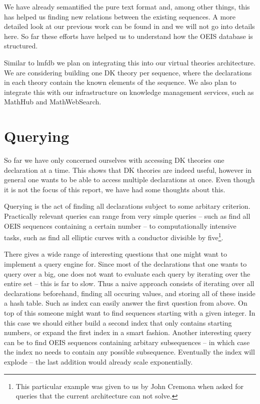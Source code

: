 We have already semantified the pure text format and, among other things, this has helped
us finding new relations between the existing sequences. A more detailed look at our
previous work can be found in \cite{LuzKoh:fsarfo16} and we will not go into details
here. So far these efforts have helped us to understand how the OEIS database is
structured.

Similar to lmfdb we plan on integrating this into our virtual theories architecture. We
are considering building one DK theory per sequence, where the declarations in each theory
contain the known elements of the sequence. We also plan to integrate this with our
infrastructure on knowledge management services, such as MathHub and MathWebSearch.

\section{Querying}\label{sec:querying}

So far we have only concerned ourselves with accessing DK theories one declaration at a
time. This shows that DK theories are indeed useful, however in general one wants to be
able to access multiple declarations at once. Even though it is not the focus of this
report, we have had some thoughts about this.

Querying is the act of finding all declarations subject to some arbitary
criterion. Practically relevant queries can range from very simple queries -- such as find
all OEIS sequences containing a certain number -- to computationally intensive tasks, such
as find all elliptic curves with a conductor divisible by five\footnote{This particular
  example was given to us by John Cremona when asked for queries that the current
  architecture can not solve. }.

There gives a wide range of interesting questions that one might want to implement a query
engine for. Since most of the declarations that one wants to query over a big, one does
not want to evaluate each query by iterating over the entire set -- this is far to
slow. Thus a naive approach consists of iterating over all declarations beforehand,
finding all occuring values, and storing all of these inside a hash table. Such as index
can easily answer the first question from above. On top of this someone might want to find
sequences starting with a given integer. In this case we should either build a second
index that only contains starting numbers, or expand the first index in a smart
fashion. Another interesting query can be to find OEIS sequences containing arbitary
subsequences -- in which case the index no needs to contain any possible
subsequence. Eventually the index will explode -- the last addition would already scale
exponentially.

